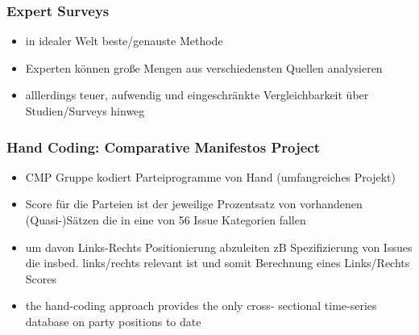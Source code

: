 \documentclass[11pt]{article}
\begin{document}
\subsubsection{Expert Surveys}
\label{sec:orgaae4d90}
\begin{itemize}
\item in idealer Welt beste/genauste Methode
\item Experten können große Mengen aus verschiedensten Quellen analysieren
\item alllerdings teuer, aufwendig und eingeschränkte Vergleichbarkeit über Studien/Surveys hinweg
\end{itemize}
\subsubsection{Hand Coding: Comparative Manifestos Project}
\label{sec:orgfedb6b1}
\begin{itemize}
\item CMP Gruppe kodiert Parteiprogramme von Hand (umfangreiches Projekt)
\item Score für die Parteien ist der jeweilige Prozentsatz von vorhandenen (Quasi-)Sätzen die in eine von 56 Issue Kategorien fallen
\item um davon Links-Rechts Positionierung abzuleiten zB Spezifizierung von Issues die insbed. links/rechts relevant ist und somit Berechnung eines Links/Rechts Scores
\item the hand-coding approach provides the only cross- sectional time-series database on party positions to date
\end{itemize}
\end{document}
